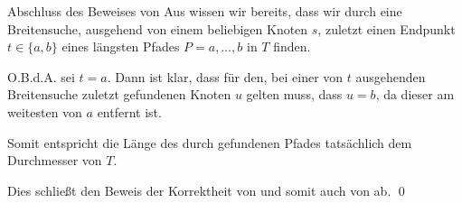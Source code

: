 \begin{frame}{Abschluss des Beweises von }
Aus  wissen wir bereits, dass wir durch eine Breitensuche, ausgehend von einem beliebigen Knoten $s$, zuletzt einen Endpunkt $t \in \{ a, b \}$ eines l\"angsten Pfades $P = a, \dots, b$ in $T$ finden.

O.B.d.A. sei $t = a$.
Dann ist klar, dass f\"ur den, bei einer von $t$ ausgehenden Breitensuche zuletzt gefundenen Knoten $u$ gelten muss, dass $u = b$, da dieser am weitesten von $a$ entfernt ist.

Somit entspricht die L\"ange des durch  gefundenen Pfades tats\"achlich dem Durchmesser von $T$.

Dies schlie{\ss}t den Beweis der Korrektheit von  und somit auch von  ab. \qed
\end{frame}

